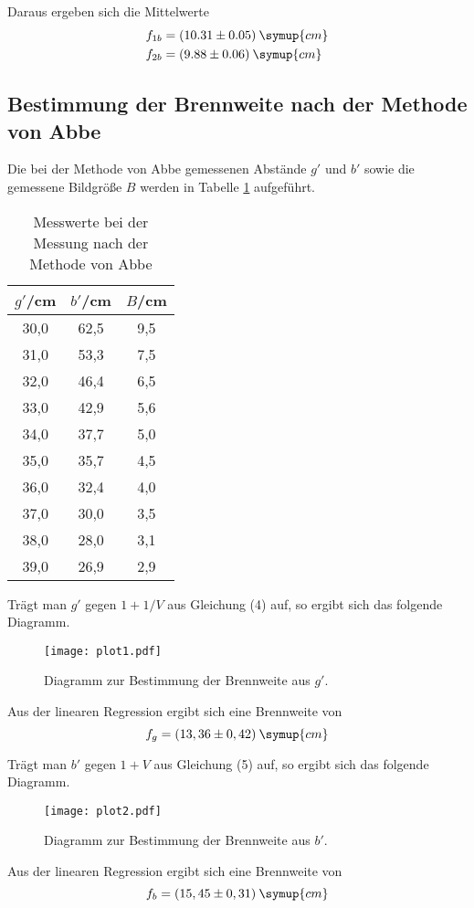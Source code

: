 Daraus ergeben sich die Mittelwerte
\begin{align*}
  &f_{1b} = (10.31 \pm 0.05) \: \symup{cm} \\
  &f_{2b} = (9.88 \pm 0.06) \: \symup{cm}
\end{align*}

\subsection{Bestimmung der Brennweite nach der Methode von Abbe}
Die bei der Methode von Abbe gemessenen Abstände $g'$ und $b'$ sowie die gemessene Bildgröße $B$
werden in Tabelle \ref{tab:abbe} aufgeführt.

\begin{table}[H]
  \centering
  \caption{Messwerte bei der Messung nach der Methode von Abbe}
  \label{tab:abbe}
  \begin{tabular}{c c c}
    \toprule
    $g'$/cm  & $b'$/cm & $B$/cm \\
    \midrule
    30,0  &  62,5  &  9,5 \\
    31,0  &  53,3  &  7,5 \\
    32,0  &  46,4  &  6,5 \\
    33,0  &  42,9  &  5,6 \\
    34,0  &  37,7  &  5,0 \\
    35,0  &  35,7  &  4,5 \\
    36,0  &  32,4  &  4,0 \\
    37,0  &  30,0  &  3,5 \\
    38,0  &  28,0  &  3,1 \\
    39,0  &  26,9  &  2,9 \\
    \bottomrule
  \end{tabular}
\end{table}

Trägt man $g'$ gegen $1+1/V$ aus Gleichung (4) auf, so ergibt sich das folgende Diagramm.

\begin{figure}
  \centering
  \texttt{[image: plot1.pdf]}
  \caption{Diagramm zur Bestimmung der Brennweite aus $g'$.}
  \label{fig:plot1}
\end{figure}

Aus der linearen Regression ergibt sich eine Brennweite von
\begin{equation*}
  f_g = (13,36 \pm 0,42)\: \symup{cm}
\end{equation*}

Trägt man $b'$ gegen $1+V$ aus Gleichung (5) auf, so ergibt sich das folgende Diagramm.

\begin{figure}
  \centering
  \texttt{[image: plot2.pdf]}
  \caption{Diagramm zur Bestimmung der Brennweite aus $b'$.}
  \label{fig:plot2}
\end{figure}

Aus der linearen Regression ergibt sich eine Brennweite von
\begin{equation*}
  f_b = (15,45 \pm 0,31)\: \symup{cm}
\end{equation*}
